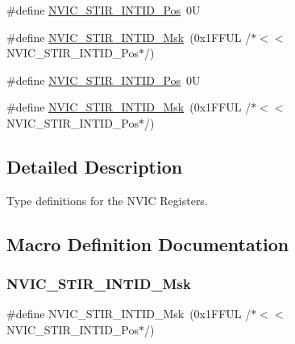 \begin{DoxyCompactItemize}
\item 
\#define \hyperlink{group___c_m_s_i_s___n_v_i_c_ga9eebe495e2e48d302211108837a2b3e8}{N\+V\+I\+C\+\_\+\+S\+T\+I\+R\+\_\+\+I\+N\+T\+I\+D\+\_\+\+Pos}~0U
\item 
\#define \hyperlink{group___c_m_s_i_s___n_v_i_c_gae4060c4dfcebb08871ca4244176ce752}{N\+V\+I\+C\+\_\+\+S\+T\+I\+R\+\_\+\+I\+N\+T\+I\+D\+\_\+\+Msk}~(0x1\+F\+F\+U\+L /$\ast$$<$$<$ N\+V\+I\+C\+\_\+\+S\+T\+I\+R\+\_\+\+I\+N\+T\+I\+D\+\_\+\+Pos$\ast$/)
\item 
\#define \hyperlink{group___c_m_s_i_s___n_v_i_c_ga9eebe495e2e48d302211108837a2b3e8}{N\+V\+I\+C\+\_\+\+S\+T\+I\+R\+\_\+\+I\+N\+T\+I\+D\+\_\+\+Pos}~0U
\item 
\#define \hyperlink{group___c_m_s_i_s___n_v_i_c_gae4060c4dfcebb08871ca4244176ce752}{N\+V\+I\+C\+\_\+\+S\+T\+I\+R\+\_\+\+I\+N\+T\+I\+D\+\_\+\+Msk}~(0x1\+F\+F\+U\+L /$\ast$$<$$<$ N\+V\+I\+C\+\_\+\+S\+T\+I\+R\+\_\+\+I\+N\+T\+I\+D\+\_\+\+Pos$\ast$/)
\end{DoxyCompactItemize}


\subsection{Detailed Description}
Type definitions for the N\+V\+IC Registers. 



\subsection{Macro Definition Documentation}
\mbox{\label{group___c_m_s_i_s___n_v_i_c_gae4060c4dfcebb08871ca4244176ce752}} 
\subsubsection{\texorpdfstring{N\+V\+I\+C\+\_\+\+S\+T\+I\+R\+\_\+\+I\+N\+T\+I\+D\+\_\+\+Msk}{NVIC\_STIR\_INTID\_Msk}\hspace{0.1cm}{\footnotesize\ttfamily [1/7]}}
{\footnotesize\ttfamily \#define N\+V\+I\+C\+\_\+\+S\+T\+I\+R\+\_\+\+I\+N\+T\+I\+D\+\_\+\+Msk~(0x1\+F\+F\+U\+L /$\ast$$<$$<$ N\+V\+I\+C\+\_\+\+S\+T\+I\+R\+\_\+\+I\+N\+T\+I\+D\+\_\+\+Pos$\ast$/)}

